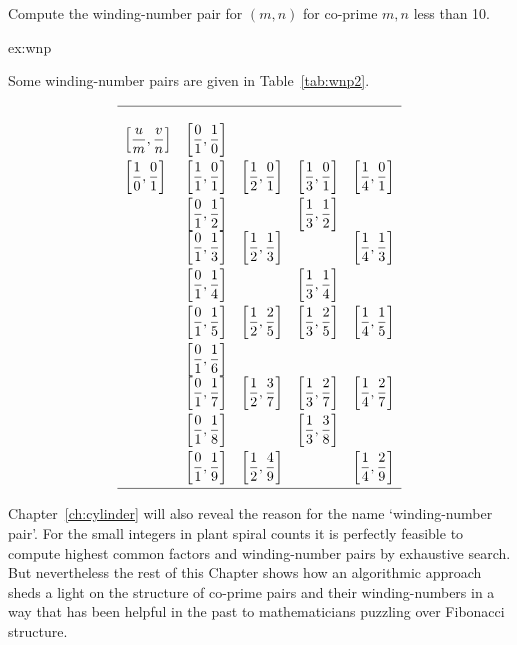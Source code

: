 \begin{jExercise}\label{ex:wnp}
	Compute the winding-number pair for $(m,n)$ for co-prime $m,n$ less than 10. 
\end{jExercise}
\begin{jAnswer}{ex:wnp}{
	Some winding-number pairs are given in Table~\ref{tab:wnp2}.
	\begin{table}
	\caption{Winding number pairs given as Farey intervals $[u/m,v/n]$. For $m$ and $n$ positive and distinct these are all contained in $[0,\jhalf]$ but the natural order of the endpoints varies with the sign of $mv-nu=\pm 1$.}
\label{tab:wnp2}
	\begin{equation*}
		\begin{array}{lllll}
			\hline
			\\
			\left[\displaystyle\frac{u}{m},\frac{v}{n}\right]
			&\left[\displaystyle\frac{0}{1},\frac{1}{0}\right]&   &  &   \\[2ex]
			\left[\displaystyle\frac{ 1}{0},\frac{0}{1}\right] &  \left[\displaystyle\frac{1}{1},\frac{0}{1}\right]  &  \left[\displaystyle\frac{1}{2},\frac{0}{1}\right]  & \left[\displaystyle\frac{1}{3},\frac{0}{1}\right]& \left[\displaystyle\frac{1}{4},\frac{0}{1}\right] \\[2ex]
			&  \left[\displaystyle\frac{0}{1},\frac{1}{2}\right]&  & \left[\displaystyle\frac{1}{3},\frac{1}{2}\right] &  \\
			&  \left[\displaystyle\frac{0}{1},\frac{1}{3}\right] & \left[\displaystyle\frac{1}{2},\frac{1}{3}\right] &  & \left[\displaystyle\frac{1}{4},\frac{1}{3}\right] \\[2ex]
			&  \left[\displaystyle\frac{0}{1},\frac{1}{4}\right] &  & \left[\displaystyle\frac{1}{3},\frac{1}{4}\right] & \\[2ex]
			&  \left[\displaystyle\frac{0}{1},\frac{1}{5}\right] &\left[\displaystyle\frac{1}{2},\frac{2}{5}\right] & \left[\displaystyle\frac{1}{3},\frac{2}{5}\right] &\left[\displaystyle\frac{1}{4},\frac{1}{5}\right] \\[2ex]
			&  \left[\displaystyle\frac{0}{1},\frac{1}{6}\right] &  &  &  \\
			&  \left[\displaystyle\frac{0}{1},\frac{1}{7}\right] &\left[\displaystyle\frac{1}{2},\frac{3}{7}\right]& \left[\displaystyle\frac{1}{3},\frac{2}{7}\right] & \left[\displaystyle\frac{1}{4},\frac{2}{7}\right]  \\[2ex]
			&  \left[\displaystyle\frac{0}{1},\frac{1}{8}\right] &  & \left[\displaystyle\frac{1}{3},\frac{3}{8}\right] &  \\[2ex]
			&  \left[\displaystyle\frac{0}{1},\frac{1}{9}\right] & \left[\displaystyle\frac{1}{2},\frac{4}{9}\right] &  & \left[\displaystyle\frac{1}{4},\frac{2}{9}\right]  \\[2ex]
			\hline
		\end{array}
	\end{equation*}
		\end{table}
}\end{jAnswer}
Chapter~\ref{ch:cylinder} will also reveal the reason for the name `winding-number pair'. 
For the small integers in plant spiral counts it is perfectly feasible to compute highest common factors and winding-number pairs by exhaustive search. But nevertheless the rest of this Chapter shows how an algorithmic approach sheds a light on the structure of co-prime pairs and their winding-numbers in a way that has been helpful in the past to mathematicians puzzling over Fibonacci structure. 


